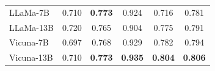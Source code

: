 \begin{table}[t]
\begin{threeparttable}
\begin{tabular}{lccccc}
LLaMa-7B      & 0.710  & \textbf{0.773}  & 0.924  & 0.716 & 0.781 \\
LLaMa-13B     & 0.720  & 0.765  & 0.904  & 0.775 & 0.791 \\
Vicuna-7B     & 0.697  & 0.768  & 0.929  & 0.782 & 0.794 \\
Vicuna-13B    & 0.710  & \textbf{0.773}  & \textbf{0.935}  & \textbf{0.804} & \textbf{0.806} \\
\bottomrule
\end{tabular}
\end{threeparttable}
\vspace{-0.3cm}
\end{table}

